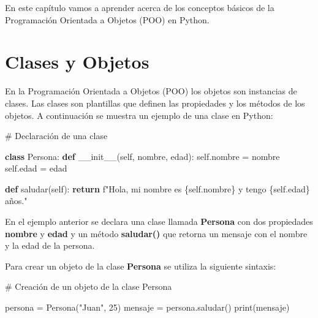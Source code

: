\documentclass[
  a4paper,
  DIV=11,
  numbers=noendperiod,
  onepage,
  openany]{scrreprt}
\newenvironment{Shaded}{\begin{snugshade}}{\end{snugshade}}
\newcommand{\BuiltInTok}[1]{\textcolor[rgb]{0.00,0.23,0.31}{#1}}
\newcommand{\CommentTok}[1]{\textcolor[rgb]{0.37,0.37,0.37}{#1}}
\newcommand{\ControlFlowTok}[1]{\textcolor[rgb]{0.00,0.23,0.31}{\textbf{#1}}}
\newcommand{\DecValTok}[1]{\textcolor[rgb]{0.68,0.00,0.00}{#1}}
\newcommand{\FunctionTok}[1]{\textcolor[rgb]{0.28,0.35,0.67}{#1}}
\newcommand{\KeywordTok}[1]{\textcolor[rgb]{0.00,0.23,0.31}{\textbf{#1}}}
\newcommand{\NormalTok}[1]{\textcolor[rgb]{0.00,0.23,0.31}{#1}}
\newcommand{\OperatorTok}[1]{\textcolor[rgb]{0.37,0.37,0.37}{#1}}
\newcommand{\SpecialCharTok}[1]{\textcolor[rgb]{0.37,0.37,0.37}{#1}}
\newcommand{\SpecialStringTok}[1]{\textcolor[rgb]{0.13,0.47,0.30}{#1}}
\newcommand{\StringTok}[1]{\textcolor[rgb]{0.13,0.47,0.30}{#1}}
\newcommand{\VariableTok}[1]{\textcolor[rgb]{0.07,0.07,0.07}{#1}}
\begin{document}
En este capítulo vamos a aprender acerca de los conceptos básicos de la
Programación Orientada a Objetos (POO) en Python.

\section{Clases y Objetos}\label{clases-y-objetos}

En la Programación Orientada a Objetos (POO) los objetos son instancias
de clases. Las clases son plantillas que definen las propiedades y los
métodos de los objetos. A continuación se muestra un ejemplo de una
clase en Python:

\begin{Shaded}
\begin{Highlighting}[]
\CommentTok{\# Declaración de una clase}

\KeywordTok{class}\NormalTok{ Persona:}
    \KeywordTok{def} \FunctionTok{\_\_init\_\_}\NormalTok{(}\VariableTok{self}\NormalTok{, nombre, edad):}
        \VariableTok{self}\NormalTok{.nombre }\OperatorTok{=}\NormalTok{ nombre}
        \VariableTok{self}\NormalTok{.edad }\OperatorTok{=}\NormalTok{ edad}

    \KeywordTok{def}\NormalTok{ saludar(}\VariableTok{self}\NormalTok{):}
        \ControlFlowTok{return} \SpecialStringTok{f"Hola, mi nombre es }\SpecialCharTok{\{}\VariableTok{self}\SpecialCharTok{.}\NormalTok{nombre}\SpecialCharTok{\}}\SpecialStringTok{ y tengo }\SpecialCharTok{\{}\VariableTok{self}\SpecialCharTok{.}\NormalTok{edad}\SpecialCharTok{\}}\SpecialStringTok{ años."}
\end{Highlighting}
\end{Shaded}

En el ejemplo anterior se declara una clase llamada \textbf{Persona} con
dos propiedades \textbf{nombre} y \textbf{edad} y un método
\textbf{saludar()} que retorna un mensaje con el nombre y la edad de la
persona.

Para crear un objeto de la clase \textbf{Persona} se utiliza la
siguiente sintaxis:

\begin{Shaded}
\begin{Highlighting}[]
\CommentTok{\# Creación de un objeto de la clase Persona}

\NormalTok{persona }\OperatorTok{=}\NormalTok{ Persona(}\StringTok{"Juan"}\NormalTok{, }\DecValTok{25}\NormalTok{)}
\NormalTok{mensaje }\OperatorTok{=}\NormalTok{ persona.saludar()}
\BuiltInTok{print}\NormalTok{(mensaje)}
\end{Highlighting}
\end{Shaded}
\end{document}
